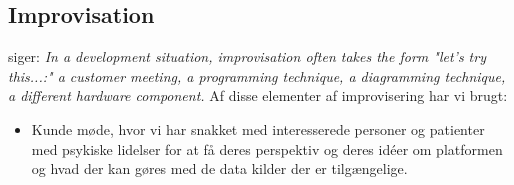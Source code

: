 \subsection{Improvisation}
\citet[side 56]{book:softwareinnovation} siger: \textit{In a development situation, improvisation often takes the form "let's try this...:" a customer meeting, a programming technique, a diagramming technique, a different hardware component.}
Af disse elementer af improvisering har vi brugt: 
\begin{itemize}
	\item Kunde møde, hvor vi har snakket med interesserede personer og patienter med psykiske lidelser for at få deres perspektiv og deres idéer om platformen og hvad der kan gøres med de data kilder der er tilgængelige. 
\end{itemize} 